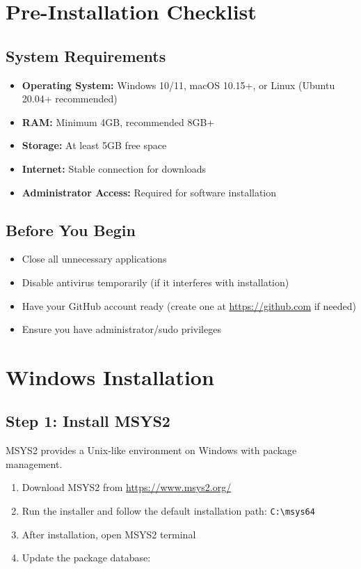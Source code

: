 \documentclass[11pt,a4paper]{article}
\begin{document}
\section{Pre-Installation Checklist}

\subsection{System Requirements}
\begin{itemize}
    \item \textbf{Operating System:} Windows 10/11, macOS 10.15+, or Linux (Ubuntu 20.04+ recommended)
    \item \textbf{RAM:} Minimum 4GB, recommended 8GB+
    \item \textbf{Storage:} At least 5GB free space
    \item \textbf{Internet:} Stable connection for downloads
    \item \textbf{Administrator Access:} Required for software installation
\end{itemize}

\subsection{Before You Begin}
\begin{itemize}
    \item Close all unnecessary applications
    \item Disable antivirus temporarily (if it interferes with installation)
    \item Have your GitHub account ready (create one at \url{https://github.com} if needed)
    \item Ensure you have administrator/sudo privileges
\end{itemize}

\section{Windows Installation}

\subsection{Step 1: Install MSYS2}
MSYS2 provides a Unix-like environment on Windows with package management.

\begin{enumerate}
    \item Download MSYS2 from \url{https://www.msys2.org/}
    \item Run the installer and follow the default installation path: \texttt{C:\textbackslash msys64}
    \item After installation, open MSYS2 terminal
    \item Update the package database:
\end{enumerate}
\end{document}
